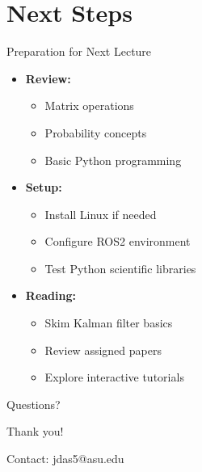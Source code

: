 \documentclass[aspectratio=169]{beamer}
\begin{document}
\section{Next Steps}

\begin{frame}{Preparation for Next Lecture}
    \begin{itemize}
        \item<1-> \textbf{Review:}
            \begin{itemize}
                \item Matrix operations
                \item Probability concepts
                \item Basic Python programming
            \end{itemize}
        \item<2-> \textbf{Setup:}
            \begin{itemize}
                \item Install Linux if needed
                \item Configure ROS2 environment
                \item Test Python scientific libraries
            \end{itemize}
        \item<3-> \textbf{Reading:}
            \begin{itemize}
                \item Skim Kalman filter basics
                \item Review assigned papers
                \item Explore interactive tutorials
            \end{itemize}
    \end{itemize}
\end{frame}

\begin{frame}{Questions?}
    \begin{center}
        \Huge Thank you!
        
        \vspace{1cm}
        \normalsize
        Contact: jdas5@asu.edu
    \end{center}
\end{frame}
\end{document}
